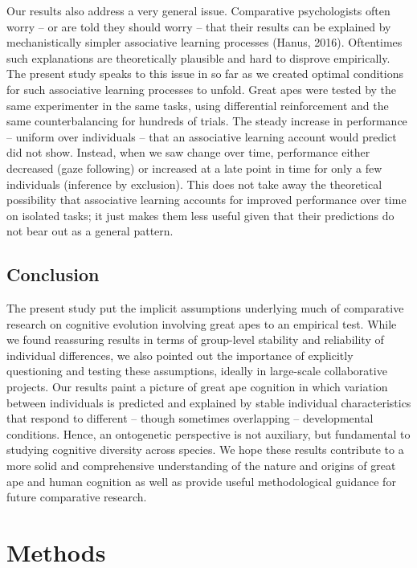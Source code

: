 \documentclass[
  man,floatsintext]{apa6}
\begin{document}
Our results also address a very general issue. Comparative psychologists often worry -- or are told they should worry -- that their results can be explained by mechanistically simpler associative learning processes (Hanus, 2016). Oftentimes such explanations are theoretically plausible and hard to disprove empirically. The present study speaks to this issue in so far as we created optimal conditions for such associative learning processes to unfold. Great apes were tested by the same experimenter in the same tasks, using differential reinforcement and the same counterbalancing for hundreds of trials. The steady increase in performance -- uniform over individuals -- that an associative learning account would predict did not show. Instead, when we saw change over time, performance either decreased (gaze following) or increased at a late point in time for only a few individuals (inference by exclusion). This does not take away the theoretical possibility that associative learning accounts for improved performance over time on isolated tasks; it just makes them less useful given that their predictions do not bear out as a general pattern.

\hypertarget{conclusion}{%
\subsection{Conclusion}\label{conclusion}}

The present study put the implicit assumptions underlying much of comparative research on cognitive evolution involving great apes to an empirical test. While we found reassuring results in terms of group-level stability and reliability of individual differences, we also pointed out the importance of explicitly questioning and testing these assumptions, ideally in large-scale collaborative projects. Our results paint a picture of great ape cognition in which variation between individuals is predicted and explained by stable individual characteristics that respond to different -- though sometimes overlapping -- developmental conditions. Hence, an ontogenetic perspective is not auxiliary, but fundamental to studying cognitive diversity across species. We hope these results contribute to a more solid and comprehensive understanding of the nature and origins of great ape and human cognition as well as provide useful methodological guidance for future comparative research.

\hypertarget{methods}{%
\section{Methods}\label{methods}}
\end{document}
